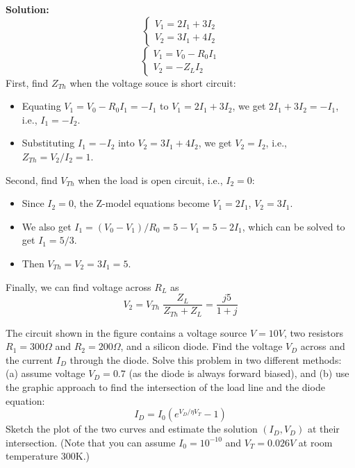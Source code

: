 \begin{enumerate}
  {\bf Solution:} 
    \[ \left\{ \begin{array}{l} V_1=2I_1+3I_2 \\ V_2=3I_1+4I_2 \end{array} \right. \]
    \[ \left\{ \begin{array}{l} V_1=V_0-R_0I_1 \\ V_2=-Z_L I_2 \end{array} \right. \]
  First, find $Z_{Th}$ when the voltage souce is short circuit:
  \begin{itemize}
    \item Equating $V_1=V_0-R_0I_1=-I_1$ to $V_1=2I_1+3I_2$, we get
      $ 2I_1+3I_2=-I_1$, i.e., $I_1=-I_2$.
    \item Substituting $I_1=-I_2$ into $V_2=3I_1+4I_2$, we get $ V_2=I_2$, i.e.,
      $Z_{Th}=V_2/I_2=1$.
  \end{itemize}
  Second, find $V_{Th}$ when the load is open circuit, i.e., $I_2=0$:
  \begin{itemize}
    \item Since $I_2=0$, the Z-model equations become $V_1=2I_1$, $V_2=3I_1$.
    \item We also get $I_1=(V_0-V_1)/R_0=5-V_1=5-2I_1$, which can be solved to 
      get $I_1=5/3$.
    \item Then $V_{Th}=V_2=3I_1=5$.
  \end{itemize}
  Finally, we can find voltage across $R_L$ as
  \[V_2=V_{Th}\;\frac{Z_L}{Z_{Th}+Z_L}=\frac{j5}{1+j} \]

\end{enumerate}


\item The circuit shown in the figure contains a voltage source $V=10V$,
two resistors $R_1=300\Omega$ and $R_2=200\Omega$, and a silicon diode.
Find the voltage $V_D$ across and the current $I_D$ through the diode.
Solve this problem in two different methods: (a) assume voltage $V_D=0.7$ 
(as the diode is always forward biased), and (b) use the graphic approach
to find the intersection of the load line and the diode equation:
\[ I_D=I_0 ( e^{V_D/\eta V_T}-1 ) \]
Sketch the plot of the two curves and estimate the solution $(I_D,V_D)$
at their intersection. (Note that you can assume $I_0=10^{-10}$ and 
$V_T=0.026V$ at room temperature 300K.)



